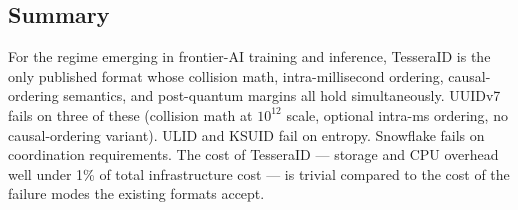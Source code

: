\subsection{Summary}

For the regime emerging in frontier-AI training and inference, TesseraID is the only published format whose collision math, intra-millisecond ordering, causal-ordering semantics, and post-quantum margins all hold simultaneously. UUIDv7 fails on three of these (collision math at $10^{12}$ scale, optional intra-ms ordering, no causal-ordering variant). ULID and KSUID fail on entropy. Snowflake fails on coordination requirements. The cost of TesseraID --- storage and CPU overhead well under 1\% of total infrastructure cost --- is trivial compared to the cost of the failure modes the existing formats accept.

